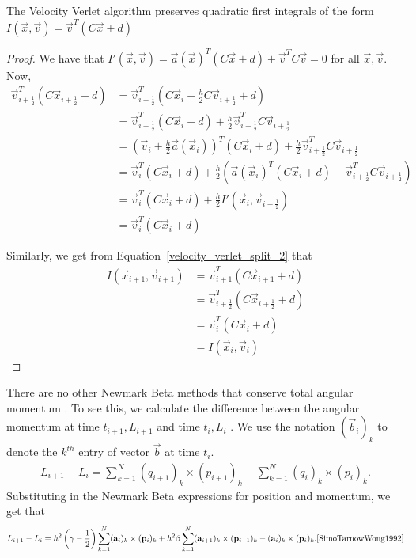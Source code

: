 \documentclass[../Main.tex]{subfiles}
\begin{document}
\begin{theorem} The Velocity Verlet algorithm preserves quadratic first integrals of the form $I(\vec{x}, \vec{v}) = \vec{v}^{T}\left(C\vec{x} + d\right)$ \label{thm:specific_quadratic_first_integral_preservation} \end{theorem}
\begin{proof}
We have that $I'(\vec{x}, \vec{v}) = \vec{a}(\vec{x})^{T}\left(C\vec{x} + d\right) + \vec{v}^{T}C\vec{v} = 0$ for all $\vec{x}, \vec{v}$.
Now,
\begin{align*}
\vec{v}_{i+\frac{1}{2}}^{T}\left(C\vec{x}_{i+\frac{1}{2}} + d\right) &= \vec{v}_{i+\frac{1}{2}}^{T}\left(C\vec{x}_{i} + \frac{h}{2}C\vec{v}_{i+\frac{1}{2}} + d\right) \\
&= \vec{v}_{i+\frac{1}{2}}^{T}\left(C\vec{x}_{i} + d\right) + \frac{h}{2}\vec{v}_{i+\frac{1}{2}}^{T}C\vec{v}_{i+\frac{1}{2}} \\
&= \left(\vec{v}_{i} + \frac{h}{2}\vec{a}(\vec{x}_{i})\right)^{T}\left(C\vec{x}_{i} + d\right)+ \frac{h}{2}\vec{v}_{i+\frac{1}{2}}^{T}C\vec{v}_{i+\frac{1}{2}} \\
&=\vec{v}_{i}^{T}(C\vec{x}_{i} + d) + \frac{h}{2}\left( \vec{a}(\vec{x}_{i})^{T}(C\vec{x}_{i} + d) + \vec{v}_{i+\frac{1}{2}}^{T}C\vec{v}_{i+\frac{1}{2}}\right) \\
&=\vec{v}_{i}^{T}(C\vec{x}_{i} + d) + \frac{h}{2}I'(\vec{x}_{i}, \vec{v}_{i+\frac{1}{2}}) \\
&=\vec{v}_{i}^{T}(C\vec{x}_{i} + d)
\end{align*}

Similarly, we get from Equation~\ref{velocity_verlet_split_2} that
\begin{align*}
I(\vec{x}_{i+1}, \vec{v}_{i+1}) &=\vec{v}_{i+1}^{T}(C\vec{x}_{i+1} + d) \\
&= \vec{v}_{i+\frac{1}{2}}^{T}\left(C\vec{x}_{i+\frac{1}{2}} + d\right) \\
&=\vec{v}_{i}^{T}(C\vec{x}_{i} + d) \\
&= I(\vec{x}_{i}, \vec{v}_{i})
\end{align*}
\end{proof}

There are no other Newmark Beta methods that conserve total angular momentum \cite{Newmark1959}. To see this, we calculate
the difference between the angular momentum at time $t_{i+1}, L_{i+1}$ and time $t_{i}, L_{i}$ \cite{SimoTarnowWong1992}. We use the notation $\left(\vec{b}_{i}\right)_{k}$ to denote the $k^{th}$ entry of vector $\vec{b}$ at time $t_{i}$.
\begin{align*}
L_{i+1} -  L_{i} = \sum_{k=1}^{N}\left(q_{i+1}\right)_{k} \times \left(p_{i+1}\right)_{k} - \sum_{k=1}^{N}\left(q_{i}\right)_{k} \times \left(p_{i}\right)_{k}.
\end{align*}
Substituting in the Newmark Beta expressions for position and momentum, we get that
\begin{align}
L_{i+1} -  L_{i} = h^{2}\left(\gamma - \frac{1}{2}\right)\sum_{k=1}^{N} (\vec{a}_{i})_{k} \times (\vec{p}_{i})_{k} + h^{2}\beta\sum_{k=1}^{N} (\vec{a}_{i+1})_{k} \times (\vec{p}_{i+1})_{k} - (\vec{a}_{i})_{k} \times (\vec{p}_{i})_{k} .\cite{SimoTarnowWong1992} \label{eqn:angular_momentum_diff_identity}
\end{align}
\end{document}
